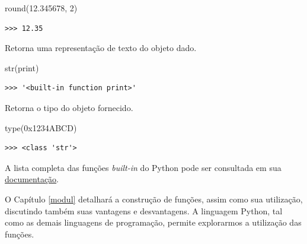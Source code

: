 \documentclass[
]{book}
\newenvironment{Shaded}{\begin{snugshade}}{\end{snugshade}}
\newcommand{\BuiltInTok}[1]{#1}
\newcommand{\DecValTok}[1]{\textcolor[rgb]{0.00,0.00,0.81}{#1}}
\newcommand{\FloatTok}[1]{\textcolor[rgb]{0.00,0.00,0.81}{#1}}
\newcommand{\NormalTok}[1]{#1}
\newcommand{\StringTok}[1]{\textcolor[rgb]{0.31,0.60,0.02}{#1}}
\providecommand{\tightlist}{%
  \setlength{\itemsep}{0pt}\setlength{\parskip}{0pt}}
\begin{document}
\begin{Shaded}
\begin{Highlighting}[]
\BuiltInTok{round}\NormalTok{(}\FloatTok{12.345678}\NormalTok{, }\DecValTok{2}\NormalTok{)}
\end{Highlighting}
\end{Shaded}

\begin{verbatim}
>>> 12.35
\end{verbatim}

\begin{description}
\tightlist
\item[\texttt{str(objeto)}]
Retorna uma representação de texto do objeto dado.
\end{description}

\begin{Shaded}
\begin{Highlighting}[]
\BuiltInTok{str}\NormalTok{(}\BuiltInTok{print}\NormalTok{)}
\end{Highlighting}
\end{Shaded}

\begin{verbatim}
>>> '<built-in function print>'
\end{verbatim}

\begin{description}
\tightlist
\item[\texttt{type(objeto)}]
Retorna o tipo do objeto fornecido.
\end{description}

\begin{Shaded}
\begin{Highlighting}[]
\BuiltInTok{type}\NormalTok{(}\StringTok{\textquotesingle{}0x1234ABCD\textquotesingle{}}\NormalTok{)}
\end{Highlighting}
\end{Shaded}

\begin{verbatim}
>>> <class 'str'>
\end{verbatim}

A lista completa das funções \emph{built-in} do Python pode ser consultada em sua \href{https://docs.python.org/3/library/functions.html}{documentação}.

O Capítulo \ref{modul} detalhará a construção de funções, assim como sua utilização, discutindo também suas vantagens e desvantagens. A linguagem Python, tal como as demais linguagens de programação, permite explorarmos a utilização das funções.
\end{document}
